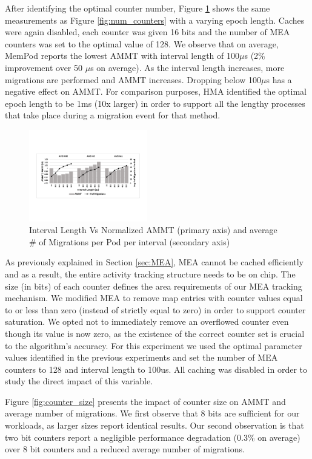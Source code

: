 After identifying the optimal counter number, Figure \ref{fig:interval} shows the same measurements as Figure \ref{fig:num_counters} with a varying epoch length. Caches were again disabled, each counter was given 16 bits and the number of MEA counters was set to the optimal value of 128. We observe that on average, MemPod reports the lowest AMMT with interval length of 100$\mu$s (2\% improvement over 50 $\mu$s on average). As the interval length increases, more migrations are performed and AMMT increases. Dropping below 100$\mu$s has a negative effect on AMMT. For comparison purposes, HMA \cite{meswani-HPCA21} identified the optimal epoch length to be 1ms (10x larger) in order to support all the lengthy processes that take place during a migration event for that method.

\begin{figure}[h]
  \includegraphics[width=0.46\textwidth]{figures/interval_length_normalized.pdf}
  \caption{Interval Length Vs Normalized AMMT (primary axis) and average \# of Migrations per Pod per interval (secondary axis)}
  \label{fig:interval}
\end{figure}

As previously explained in Section \ref{sec:MEA}, MEA cannot be cached efficiently and as a result, the entire activity tracking structure needs to be on chip. The size (in bits) of each counter defines the area requirements of our MEA tracking mechanism. We modified MEA to remove map entries with counter values equal to or less than zero (instead of strictly equal to zero) in order to support counter saturation. We opted not to immediately remove an overflowed counter even though its value is now zero, as the existence of the correct counter set is crucial to the algorithm's accuracy. For this experiment we used the optimal parameter values identified in the previous experiments and set the number of MEA counters to 128 and interval length to 100us. All caching was disabled in order to study the direct impact of this variable.

Figure \ref{fig:counter_size} presents the impact of counter size on AMMT and average number of migrations. We first observe that 8 bits are sufficient for our workloads, as larger sizes report identical results. Our second observation is that two bit counters report a negligible performance degradation (0.3\% on average) over 8 bit counters and a reduced average number of migrations.

